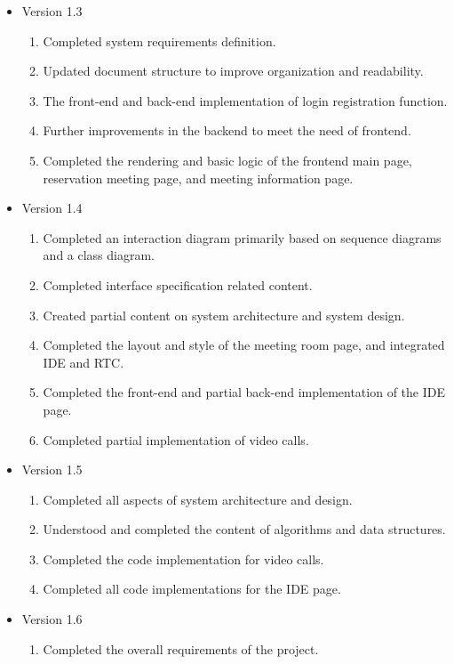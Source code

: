 \documentclass{article}
\begin{document}
\begin{itemize}
\begin{enumerate}
    \end{enumerate}
    \item Version 1.3
    \begin{enumerate}
        \item Completed system requirements definition.
        \item Updated document structure to improve organization and readability.
        \item The front-end and back-end implementation of login registration function.
        \item Further improvements in the backend to meet the need of frontend.
        \item Completed the rendering and basic logic of the frontend main page, reservation meeting page, and meeting information page.
    \end{enumerate}
    \item Version 1.4
    \begin{enumerate}
        \item Completed an interaction diagram primarily based on sequence diagrams and a class diagram.
        \item Completed interface specification related content.
        \item Created partial content on system architecture and system design.
        \item Completed the layout and style of the meeting room page, and integrated IDE and RTC.
        \item Completed the front-end and partial back-end implementation of the IDE page.
        \item Completed partial implementation of video calls.
    \end{enumerate}
    \item Version 1.5
    \begin{enumerate}
        \item Completed all aspects of system architecture and design.
        \item Understood and completed the content of algorithms and data structures.
        \item Completed the code implementation for video calls.
        \item Completed all code implementations for the IDE page.
    \end{enumerate}
    \item Version 1.6
    \begin{enumerate}
        \item Completed the overall requirements of the project.

\end{enumerate}
\end{itemize}
\end{document}
